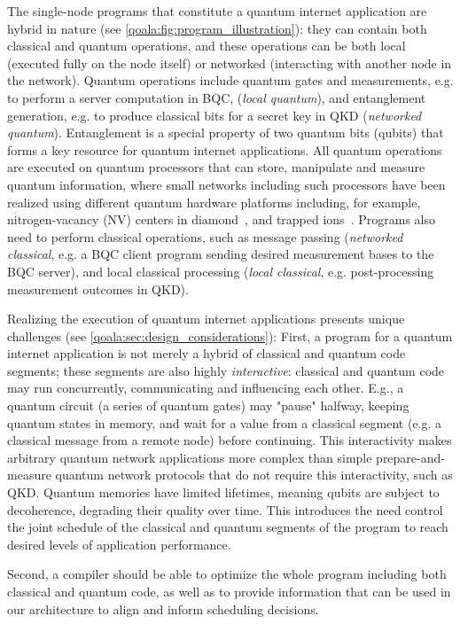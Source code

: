 The single-node programs that constitute a quantum internet application are hybrid in nature (see \cref{qoala:fig:program_illustration}):
they can contain both classical and quantum operations, and these operations can be both local (executed fully on the node itself) or networked (interacting with another node in the network).
Quantum operations include quantum gates and measurements, e.g. to perform a server computation in BQC, (\textit{local quantum}), and entanglement generation, e.g. to produce classical bits for a secret key in QKD (\textit{networked quantum}).
Entanglement is a special property of two quantum bits (qubits) that forms a key resource for quantum internet applications. 
All quantum operations are executed on quantum processors that can store, manipulate and measure quantum information, where small networks including such processors have been realized using different quantum hardware platforms including, for example,  nitrogen-vacancy (NV) centers in diamond~\cite{pompili2021realization}, and trapped ions~\cite{krutyanskiy2023entanglement}.
Programs also need to perform classical operations, such as message passing (\textit{networked classical}, e.g. a BQC client program sending desired measurement bases to the BQC server), and local classical processing (\textit{local classical}, e.g. post-processing measurement outcomes in QKD).

Realizing the execution of quantum internet applications presents unique challenges (see \cref{qoala:sec:design_considerations}): 
First, a program for a quantum internet application is not merely a hybrid of classical and quantum code segments; these segments are also highly \textit{interactive}: classical and quantum code may run concurrently, communicating and influencing each other.
E.g., a quantum circuit (a series of quantum gates) may "pause" halfway, keeping quantum states in memory, and wait for a value from a classical segment (e.g. a classical message from a remote node) before continuing.
This interactivity makes arbitrary quantum network applications more complex than simple prepare-and-measure quantum network protocols that do not require this interactivity, such as QKD.
Quantum memories have limited lifetimes, meaning qubits are subject to decoherence, degrading their quality over time. This introduces the need 
control the joint schedule of the classical and quantum segments of the program to reach desired levels of application performance.

Second, a compiler should be able to optimize the whole program including both classical and quantum code, as well as to provide information that can be used in our architecture to align and inform scheduling decisions. 

